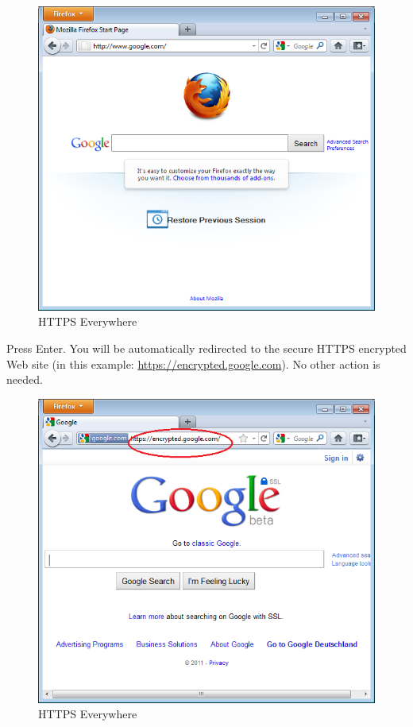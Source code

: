 \begin{figure}[htbp]
\centering
\includegraphics{https_everywhere_5.png}
\caption{HTTPS Everywhere}
\end{figure}

Press Enter. You will be automatically redirected to the secure HTTPS
encrypted Web site (in this example:
\href{https://encrypted.google.com}{https://encrypted.google.com}). No
other action is needed.

\begin{figure}[htbp]
\centering
\includegraphics{https_everywhere_6.png}
\caption{HTTPS Everywhere}
\end{figure}

